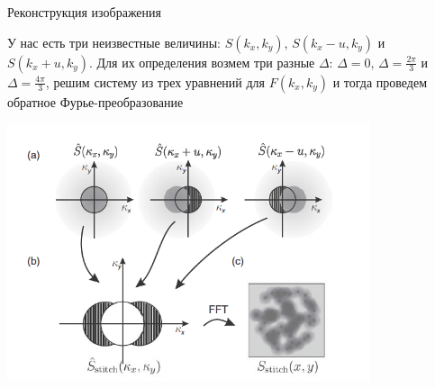 \documentclass[9pt, compress, xcolor=table]{beamer}
\begin{document}
\begin{frame}{Реконструкция изображения}

У нас есть три неизвестные величины:  $S(k_x,k_y)$, $S(k_x-u,k_y)$ и $S(k_x+u,k_y)$. Для их определения возмем три разные $\Delta$: $\Delta=0$, $\Delta = \frac{2\pi}{3}$ и $\Delta = \frac{4\pi}{3}$, решим систему из трех уравнений для $F(k_x,k_y)$ и тогда проведем обратное Фурье-преобразование

\begin{center}
\includegraphics[width=0.8\textwidth]{ffm17}
\end{center}
\end{frame}
\end{document}
